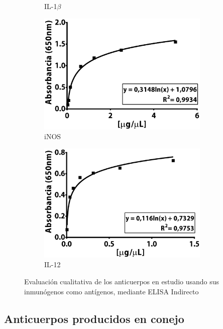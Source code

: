 \documentclass[12pt,letterpaper,oneside]{scrbook}
\begin{document}
\begin{figure}[h]
\begin{subfigure}{0.5\textwidth}
        \caption{IL-1$\beta$}
        \label{fig:pep:il1b}
    \end{subfigure}
     \begin{subfigure}{0.5\textwidth}
        \includegraphics[width=0.9\textwidth]{peptidos/inos}
        \caption{iNOS}
        \label{fig:pep:inos}
    \end{subfigure}
    \begin{subfigure}{0.5\textwidth}
        \includegraphics[width=0.9\textwidth]{peptidos/il12}
        \caption{IL-12}
        \label{fig:pep:il12}
    \end{subfigure}
    \caption{Evaluación cualitativa de los anticuerpos en estudio usando sus inmunógenos como antígenos, mediante ELISA Indirecto}
    \label{fig:pep}
\end{figure}

\subsection{Anticuerpos producidos en conejo}
\end{document}
